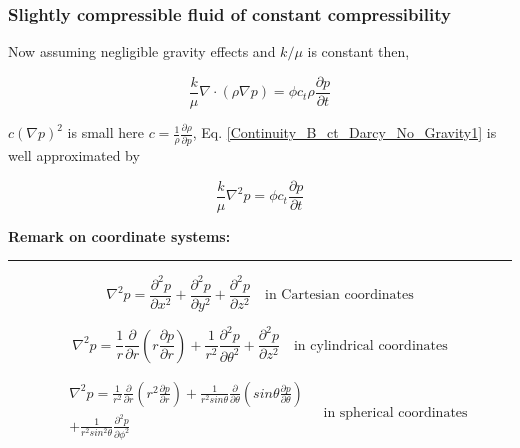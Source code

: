 \documentclass{llncs}
\numberwithin{equation}{section}
\numberwithin{figure}{section}
\numberwithin{table}{section}
\begin{document}
    \subsubsection{Slightly compressible fluid of constant compressibility}

    Now assuming negligible gravity effects and $k/\mu$ is constant then,

    \begin{equation}
        \frac{k}{\mu }\nabla \cdot \left( \rho \nabla p \right)=\phi {{c}_{t}}\rho \frac{\partial p}{\partial t}
    \label{Continuity_B_ct_Darcy_No_Gravity1}
    \end{equation}

     $c{{\left( \nabla p \right)}^{2}}$ is small here $c=\frac{1}{\rho }\frac{\partial \rho }{\partial p}$, Eq. \ref{Continuity_B_ct_Darcy_No_Gravity1} is well approximated by

    \begin{equation}
        \frac{k}{\mu }{{\nabla }^{2}}p=\phi {{c}_{t}}\frac{\partial p}{\partial t}
    \label{Continuity_B_ct_Darcy_No_Gravity1_approx}
    \end{equation}

    \vspace{15pt}
    \large{\textbf{Remark on coordinate systems:}}\\
    \rule{\textwidth}{1pt}

    \begin{equation*}
        {{\nabla }^{2}}p=\frac{{{\partial }^{2}}p}{\partial {{x}^{2}}}+\frac{{{\partial }^{2}}p}{\partial {{y}^{2}}}+\frac{{{\partial }^{2}}p}{\partial {{z}^{2}}}\quad \text{in Cartesian coordinates}
    \label{Laplacian_Cartesian}
    \end{equation*}

    \begin{equation*}
        {{\nabla }^{2}}p=\frac{1}{r}\frac{\partial }{\partial r}\left( r\frac{\partial p}{\partial r} \right)+\frac{1}{{{r}^{2}}}\frac{{{\partial }^{2}}p}{\partial {{\theta }^{2}}}+\frac{{{\partial }^{2}}p}{\partial {{z}^{2}}}\quad \text{in cylindrical coordinates}
    \label{Laplacian_Cylindrical}
    \end{equation*}

    \begin{equation*}
        \begin{split}
    & {{\nabla }^{2}}p=\frac{1}{{{r}^{2}}}\frac{\partial }{\partial r}\left( {{r}^{2}}\frac{\partial p}{\partial r} \right)+\frac{1}{{{r}^{2}}sin\theta }\frac{\partial }{\partial \theta }\left( sin\theta \frac{\partial p}{\partial \theta } \right) \\
    & +\frac{1}{{{r}^{2}}si{{n}^{2}}\theta }\frac{{{\partial }^{2}}p}{\partial {{\phi }^{2}}} \\
    \end{split}\quad \text{in spherical coordinates}
    \label{Laplacian_Spherical}
    \end{equation*}
\end{document}
